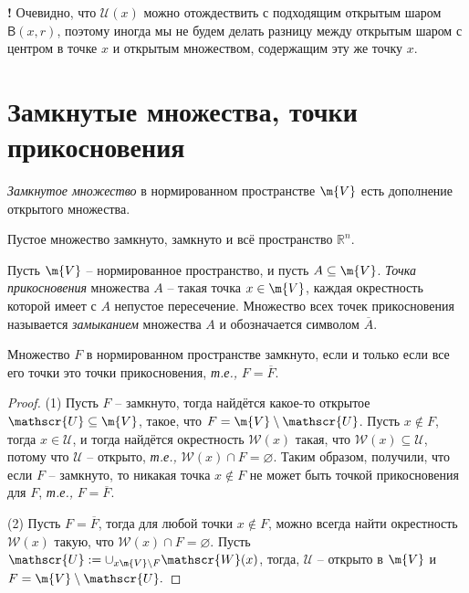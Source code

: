 \begin{mydanger}{\bf{!}}
 Очевидно, что $\mathscr{U}(x)$ можно отождествить с подходящим открытым шаром $\mathsf{B}(x,r)$, поэтому иногда мы не будем делать разницу между открытым шаром с центром в точке $x$ и открытым множеством, содержащим эту же точку $x.$    
\end{mydanger}

\section{Замкнутые множества, точки прикосновения}

\begin{definition}
    \textit{Замкнутое множество} в нормированном пространстве $\m{V}$ есть дополнение открытого множества. 
\end{definition}

Пустое множество замкнуто, замкнуто и всё пространство $\mathbb{R}^n$.


\begin{definition}\label{limit_point_in_metric}
  Пусть $\m{V}$ -- нормированное пространство, и пусть $A \subseteq \m{V}$. \textit{Точка прикосновения} множества $A$ -- такая точка $x \in \m{V}$, каждая окрестность которой имеет с $A$ непустое пересечение. Множество всех точек прикосновения называется \textit{замыканием} множества $A$ и обозначается символом $\overline{A}.$
\end{definition}


\begin{lemma}\label{closure_in_metric}
    Множество $F$ в нормированном пространстве замкнуто, если и только если все его точки это точки прикосновения, \textit{т.е.,} $F = \overline{F}.$ 
\end{lemma}
\begin{proof}
(1) Пусть $F$ -- замкнуто, тогда найдётся какое-то открытое $\mathscr{U} \subseteq \m{V}$, такое, что $F  = \m{V} \setminus \mathscr{U}$. Пусть $x \notin F$, тогда $x \in \mathscr{U}$, и тогда найдётся окрестность $\mathscr{W}(x)$ такая, что $\mathscr{W}(x) \subseteq \mathscr{U}$, потому что $\mathscr{U}$ -- открыто, \textit{т.е.,} $\mathscr{W}(x) \cap F = \varnothing.$ Таким образом, получили, что если $F$ -- замкнуто, то никакая точка $x \notin F$ не может быть точкой прикосновения для $F$, \textit{т.е.,} $F = \overline{F}.$ 

(2) Пусть $F = \overline{F}$, тогда для любой точки $x \notin F$, можно всегда найти окрестность $\mathscr{W}(x)$ такую, что $\mathscr{W}(x) \cap F = \varnothing$. Пусть $\mathscr{U}:= \cup_{x \m{V} \setminus F} \mathscr{W}(x)$, тогда, $\mathscr{U}$ -- открыто в $\m{V}$ и $F = \m{V} \setminus \mathscr{U}.$

\end{proof}








